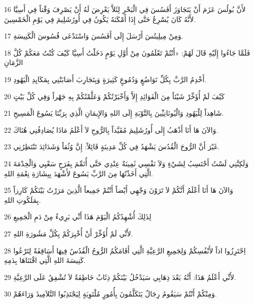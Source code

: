 \par 16 لأَنَّ بُولُسَ عَزَمَ أَنْ يَتَجَاوَزَ أَفَسُسَ فِي الْبَحْرِ لِئَلاَّ يَعْرِضَ لَهُ أَنْ يَصْرِفَ وَقْتاً فِي أَسِيَّا لأَنَّهُ كَانَ يُسْرِعُ حَتَّى إِذَا أَمْكَنَهُ يَكُونُ فِي أُورُشَلِيمَ فِي يَوْمِ الْخَمْسِينَ.
\par 17 وَمِنْ مِيلِيتُسَ أَرْسَلَ إِلَى أَفَسُسَ وَاسْتَدْعَى قُسُوسَ الْكَنِيسَةِ.
\par 18 فَلَمَّا جَاءُوا إِلَيْهِ قَالَ لَهُمْ: «أَنْتُمْ تَعْلَمُونَ مِنْ أَوَّلِ يَوْمٍ دَخَلْتُ أَسِيَّا كَيْفَ كُنْتُ مَعَكُمْ كُلَّ الزَّمَانِ
\par 19 أَخْدِمُ الرَّبَّ بِكُلِّ تَوَاضُعٍ وَدُمُوعٍ كَثِيرَةٍ وَبِتَجَارِبَ أَصَابَتْنِي بِمَكَايِدِ الْيَهُودِ.
\par 20 كَيْفَ لَمْ أُؤَخِّرْ شَيْئاً مِنَ الْفَوَائِدِ إِلاَّ وَأَخْبَرْتُكُمْ وَعَلَّمْتُكُمْ بِهِ جَهْراً وَفِي كُلِّ بَيْتٍ
\par 21 شَاهِداً لِلْيَهُودِ وَالْيُونَانِيِّينَ بِالتَّوْبَةِ إِلَى اللهِ وَالإِيمَانِ الَّذِي بِرَبِّنَا يَسُوعَ الْمَسِيحِ.
\par 22 وَالآنَ هَا أَنَا أَذْهَبُ إِلَى أُورُشَلِيمَ مُقَيَّداً بِالرُّوحِ لاَ أَعْلَمُ مَاذَا يُصَادِفُنِي هُنَاكَ.
\par 23 غَيْرَ أَنَّ الرُّوحَ الْقُدُسَ يَشْهَدُ فِي كُلِّ مَدِينَةٍ قَائِلاً: إِنَّ وُثُقاً وَشَدَائِدَ تَنْتَظِرُنِي.
\par 24 وَلَكِنَّنِي لَسْتُ أَحْتَسِبُ لِشَيْءٍ وَلاَ نَفْسِي ثَمِينَةٌ عِنْدِي حَتَّى أُتَمِّمَ بِفَرَحٍ سَعْيِي وَالْخِدْمَةَ الَّتِي أَخَذْتُهَا مِنَ الرَّبِّ يَسُوعَ لأَشْهَدَ بِبِشَارَةِ نِعْمَةِ اللهِ.
\par 25 وَالآنَ هَا أَنَا أَعْلَمُ أَنَّكُمْ لاَ تَرَوْنَ وَجْهِي أَيْضاً أَنْتُمْ جَمِيعاً الَّذِينَ مَرَرْتُ بَيْنَكُمْ كَارِزاً بِمَلَكُوتِ اللهِ.
\par 26 لِذَلِكَ أُشْهِدُكُمُ الْيَوْمَ هَذَا أَنِّي بَرِيءٌ مِنْ دَمِ الْجَمِيعِ
\par 27 لأَنِّي لَمْ أُؤَخِّرْ أَنْ أُخْبِرَكُمْ بِكُلِّ مَشُورَةِ اللهِ.
\par 28 اِحْتَرِزُوا اذاً لأَنْفُسِكُمْ وَلِجَمِيعِ الرَّعِيَّةِ الَّتِي أَقَامَكُمُ الرُّوحُ الْقُدُسُ فِيهَا أَسَاقِفَةً لِتَرْعُوا كَنِيسَةَ اللهِ الَّتِي اقْتَنَاهَا بِدَمِهِ.
\par 29 لأَنِّي أَعْلَمُ هَذَا: أَنَّهُ بَعْدَ ذِهَابِي سَيَدْخُلُ بَيْنَكُمْ ذِئَابٌ خَاطِفَةٌ لاَ تُشْفِقُ عَلَى الرَّعِيَّةِ.
\par 30 وَمِنْكُمْ أَنْتُمْ سَيَقُومُ رِجَالٌ يَتَكَلَّمُونَ بِأُمُورٍ مُلْتَوِيَةٍ لِيَجْتَذِبُوا التَّلاَمِيذَ وَرَاءَهُمْ.
